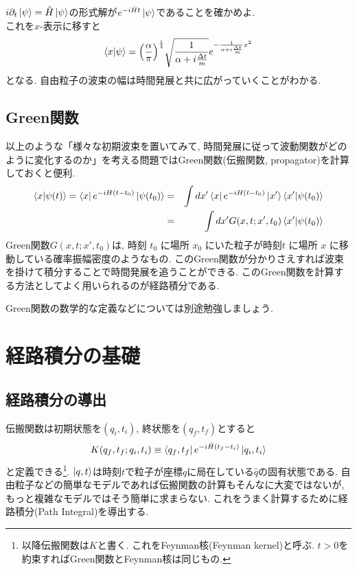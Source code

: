 \documentclass[10.5pt,a4paper]{jreport}
\begin{document}
 $i\partial_t\ket{\psi} = \hat{H}\ket{\psi}$の形式解が$e^{-i\hat{H}t}\ket{\psi}$であることを確かめよ.\\

これを$x$-表示に移すと
\begin{eqnarray}
  \bra{x}\ket{\psi} = \qty(\frac{\alpha}{\pi})^{\frac{1}{4}}\sqrt{\frac{1}{\alpha + i\frac{\Delta t}{m}}}e^{-\frac{1}{\alpha + i\frac{\Delta t}{m}}x^2}\label{DevelopedFreeWavePacket}
\end{eqnarray}
となる. 自由粒子の波束の幅は時間発展と共に広がっていくことがわかる.
\subsection{Green関数}
以上のような「様々な初期波束を置いてみて, 時間発展に従って波動関数がどのように変化するのか」を考える問題ではGreen関数(伝搬関数, propagator)を計算しておくと便利.
\begin{eqnarray}
  \bra{x}\ket{\psi(t)} = \bra{x}e^{-iH(t-t_0)}\ket{\psi(t_0)} &=& \int dx'\bra{x}e^{-iH(t-t_0)}\ket{x'}\bra{x'}\ket{\psi(t_0)}\\
  &=& \int dx' G(x, t;x', t_0)\bra{x'}\ket{\psi(t_0)}
\end{eqnarray}
Green関数$G(x, t;x', t_0)$は, 時刻 $t_0$ に場所 $x_0$ にいた粒子が時刻$t$ に場所 $x$ に移動している確率振幅密度のようなもの. このGreen関数が分かりさえすれば波束を掛けて積分することで時間発展を追うことができる. このGreen関数を計算する方法としてよく用いられるのが経路積分である.

Green関数の数学的な定義などについては別途勉強しましょう.
\section{経路積分の基礎}
\subsection{経路積分の導出}
伝搬関数は初期状態を$(q_i, t_i)$, 終状態を$(q_f, t_f)$とすると
\begin{eqnarray}
  K(q_f, t_f;q_i, t_i) \equiv \bra{q_f, t_f}e^{-i\hat{H}(t_f-t_i)}\ket{q_i, t_i}
\end{eqnarray}
と定義できる\footnote{以降伝搬関数は$K$と書く. これをFeynman核(Feynman kernel)と呼ぶ. $t>0$を約束すればGreen関数とFeynman核は同じもの. }. $\ket{q, t}$は時刻$t$で粒子が座標$q$に局在している$\hat{q}$の固有状態である. 自由粒子などの簡単なモデルであれば伝搬関数の計算もそんなに大変ではないが, もっと複雑なモデルではそう簡単に求まらない. これをうまく計算するために経路積分(Path Integral)を導出する.
\end{document}
